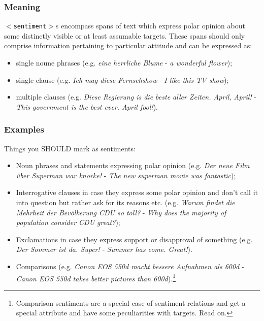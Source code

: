 \documentclass[11pt,a4paper]{article}
\newcommand{\xmltag}[1]{\textcolor{black}{{\small$<$#1$>$}}}
\begin{document}
\subsubsection{Meaning}

\texttt{\xmltag{sentiment}}s encompass spans of text which express
polar opinion about some distinctly visible or at least assumable
targets. These spans should only comprise information pertaining to
particular attitude and can be expressed as:
\begin{itemize}
  \item single noune phrases (e.g. \textit{eine herrliche Blume} -
    \textit{a wonderful flower});
  \item single clause (e.g. \textit{Ich mag diese Fernsehshow} -
    \textit{I like this TV show});
  \item multiple clauses (e.g. \textit{Diese Regierung is die beste
    aller Zeiten. April, April!} - \textit{This government is the best
    ever. April fool!}).
\end{itemize}

\subsubsection{Examples}
Things you SHOULD mark as sentiments:
\begin{itemize}
  \item Noun phrases and statements expressing polar opinion
    (e.g. \textit{Der neue Film \"uber Superman war knorke!} -
    \textit{The new superman movie was fantastic});
  \item Interrogative clauses in case they express some polar opinion
    and don't call it into question but rather ask for its reasons
    etc. (e.g. \textit{Warum findet die Mehrheit der Bev\"olkerung CDU
      so toll?} - \textit{Why does the majority of population consider
      CDU great?});
  \item Exclamations in case they express support or disapproval of
    something (e.g. \textit{Der Sommer ist da. Super!} -
    \textit{Summer has come. Great!}).
  \item Comparisons (e.g. \textit{Canon EOS 550d macht bessere
    Aufnahmen als 600d} - \textit{Canon EOS 550d takes better pictures
    than 600d}).\footnote{Comparison sentiments are a special case of
    sentiment relations and get a special attribute and have some
    peculiarities with targets. Read on.}

\end{itemize}
\end{document}
